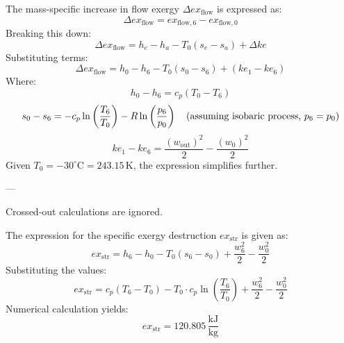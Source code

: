 The mass-specific increase in flow exergy \( \Delta ex_{\text{flow}} \) is expressed as:  
\[
\Delta ex_{\text{flow}} = ex_{\text{flow},6} - ex_{\text{flow},0}
\]  
Breaking this down:  
\[
\Delta ex_{\text{flow}} = h_e - h_a - T_0 (s_e - s_a) + \Delta ke
\]  
Substituting terms:  
\[
\Delta ex_{\text{flow}} = h_0 - h_6 - T_0 (s_0 - s_6) + (ke_1 - ke_6)
\]  
Where:  
\[
h_0 - h_6 = c_p (T_0 - T_6)
\]  
\[
s_0 - s_6 = -c_p \ln \left( \frac{T_6}{T_0} \right) - R \ln \left( \frac{p_6}{p_0} \right) \quad \text{(assuming isobaric process, \( p_6 = p_0 \))}
\]  
\[
ke_1 - ke_6 = \frac{(w_{\text{out}})^2}{2} - \frac{(w_0)^2}{2}
\]  
Given \( T_0 = -30^\circ\text{C} = 243.15 \, \text{K} \), the expression simplifies further.

---

Crossed-out calculations are ignored.

The expression for the specific exergy destruction \( ex_{\text{str}} \) is given as:  
\[
ex_{\text{str}} = h_6 - h_0 - T_0 (s_6 - s_0) + \frac{w_6^2}{2} - \frac{w_0^2}{2}
\]  
Substituting the values:  
\[
ex_{\text{str}} = c_p (T_6 - T_0) - T_0 \cdot c_p \ln \left( \frac{T_6}{T_0} \right) + \frac{w_6^2}{2} - \frac{w_0^2}{2}
\]  
Numerical calculation yields:  
\[
ex_{\text{str}} = 120.805 \, \frac{\text{kJ}}{\text{kg}}
\]